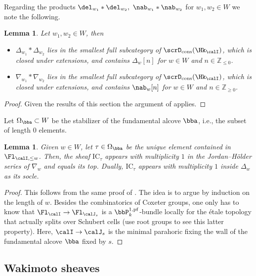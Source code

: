 \documentclass[10pt, reqno]{amsart}
\theoremstyle{plain}
\newtheorem{lemma}[theorem]{Lemma}
\theoremstyle{definition}
\numberwithin{equation}{section}
\begin{document}
	Regarding the products $\del_{w_1}\ast \del_{w_2},\ \nab_{w_1}\ast \nab_{w_2}$ for $w_1,w_2\in W$ we note the following. 
	
	\begin{lemma}\label{lemma_convolution_stds_and_costds}
		Let $w_1,w_2\in W$, then
		\begin{itemize}
			\item [(1)] $\Delta_{w_1}*\Delta_{w_2}$ lies in the smallest full subcategory of $\scrD_{\mathrm{cons}}(\Hk_{\calI})$, which is closed under extensions, and contains $\Delta_w[n]$ for $w\in W$ and $n\in\mathbb{Z}_{\leq 0}$.
			\item[(2)]$\nabla_{w_1}*\nabla_{w_2}$ lies in the smallest full subcategory of $\scrD_{\mathrm{cons}}(\Hk_{\calI})$, which is closed under extensions, and contains $\nab_w[n]$ for $w\in W$ and $n\in\mathbb{Z}_{\geq 0}$.
		\end{itemize}
		
		
	\end{lemma}
	\begin{proof}
		Given the results of this section the argument of \cite[Lemma 6.5.8]{AR} applies.
	\end{proof}
	
	Let $\Omega_{\bba} \subset W$ be the stabilizer of the fundamental alcove $\bba$, i.e., the subset of length $0$ elements.
	
	\begin{lemma}\label{lem_socle_top_stand_costand}
		Given $w \in W$, let $\tau \in \Omega_{\bba}$ be the unique element contained in $\Fl_{ \calI,\leq w}$. Then, the sheaf $\mathrm{IC}_\tau$ appears with multiplicity $1$ in the Jordan--Hölder series of $\nabla_w$ and equals its top. Dually, $\mathrm{IC}_\tau$ appears with multiplicity $1$ inside $\Delta_w$ as its socle.
	\end{lemma}
	
	\begin{proof}
		This follows from the same proof of \cite[Lemma 2.1]{BBM04}. The idea is to argue by induction on the length of $w$. Besides the combinatorics of Coxeter groups, one only has to know that $\Fl_{ \calI} \to \Fl_{ \calJ_s}$ is a $\bbP_k^{1,\mathrm{pf}}$-bundle locally for the étale topology that actually splits over Schubert cells (use root groups to see this latter property). Here, $\calI \to \calJ_s$ is the minimal parahoric fixing the wall of the fundamental alcove $\bba$ fixed by $s$.
	\end{proof}
	
	\subsection{Wakimoto sheaves}
	\label{sec:wakim-funct-calj}
	
\end{document}
